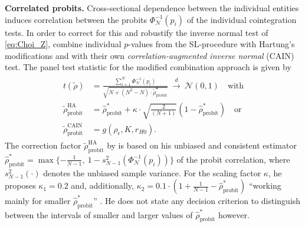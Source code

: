 \textbf{Correlated probits.} Cross-sectional dependence between the individual entities induces correlation between the probits $ \Phi_{\mathcal{N}}^{-1} \left( p_i \right) $ of the individual cointegration tests. In order to correct for this and robustify the inverse normal test of \eqref{eq:Choi_Z}, \citet{ArsovaOersal2021} combine individual $p$-values from the SL-procedure with Hartung's \citeyearpar{Hartung1999} modifications and with their own \textit{correlation-augmented inverse normal} (CAIN) test. The panel test statistic for the modified combination approach is given by
\begin{align} \label{eq:CAIN}
\begin{split}
	t(\tilde{\rho}) & = \frac{ \sum_{i=1}^{N} \Phi_{\mathcal{N}}^{-1} \left( p_i \right) }{\sqrt{ N + \left( N^2-N \right) \cdot \tilde{\rho}^\bullet_\text{probit} }} \ \overset{d}{\longrightarrow} \ \mathcal{N}(0,1) \quad \text{with} \\ %
	\tilde{\rho}^{\text{HA}}_\text{probit} & = \hat{\rho}^*_\text{probit} + \kappa \cdot \sqrt{ \frac{2}{ \left( N+1 \right) }} \left( 1 - \hat{\rho}^*_\text{probit} \right)  \quad \text{or} \\
	\tilde{\rho}^{\text{CAIN}}_\text{probit} & = g\left( \rho_\epsilon, K, r_{H0} \right). 
\end{split}
\end{align}
The correction factor $ \tilde{\rho}^{\text{HA}}_\text{probit} $ by \citet{Hartung1999} is based on his unbiased and consistent estimator $ \hat{\rho}^*_\text{probit} = \max \lbrace - \frac{1}{N-1}, \ 1 - s_{N-1}^2 \left( \Phi_{\mathcal{N}}^{-1} \left( p_i \right) \right) \rbrace $ of the probit correlation, where $ s_{N-1}^2(\cdot) $ denotes the unbiased sample variance. For the scaling factor $ \kappa $, he proposes $ \kappa_1 = 0.2 $ and, additionally, $ \kappa_2 = 0.1 \cdot \left( 1 + \frac{1}{N-1} - \hat{\rho}^*_\text{probit} \right) $ ``working mainly for smaller $ \hat{\rho}^*_\text{probit} $'' \citep[p.~853]{Hartung1999}. He does not state any decision criterion to distinguish between the intervals of smaller and larger values of $ \hat{\rho}^*_\text{probit} $ however.

